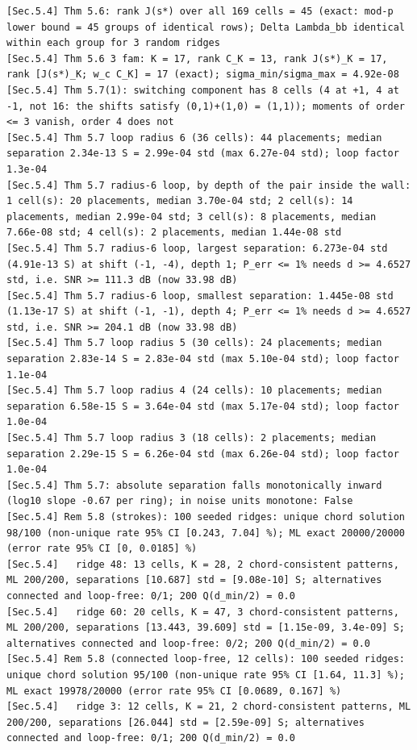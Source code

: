 \documentclass[11pt,a4paper]{article}
\theoremstyle{definition}
\theoremstyle{remark}
\begin{document}
\begin{lstlisting}[style=consolestyle]
[Sec.5.4] Thm 5.6: rank J(s*) over all 169 cells = 45 (exact: mod-p lower bound = 45 groups of identical rows); Delta Lambda_bb identical within each group for 3 random ridges
[Sec.5.4] Thm 5.6 3 fam: K = 17, rank C_K = 13, rank J(s*)_K = 17, rank [J(s*)_K; w_c C_K] = 17 (exact); sigma_min/sigma_max = 4.92e-08
[Sec.5.4] Thm 5.7(1): switching component has 8 cells (4 at +1, 4 at -1, not 16: the shifts satisfy (0,1)+(1,0) = (1,1)); moments of order <= 3 vanish, order 4 does not
[Sec.5.4] Thm 5.7 loop radius 6 (36 cells): 44 placements; median separation 2.34e-13 S = 2.99e-04 std (max 6.27e-04 std); loop factor 1.3e-04
[Sec.5.4] Thm 5.7 radius-6 loop, by depth of the pair inside the wall: 1 cell(s): 20 placements, median 3.70e-04 std; 2 cell(s): 14 placements, median 2.99e-04 std; 3 cell(s): 8 placements, median 7.66e-08 std; 4 cell(s): 2 placements, median 1.44e-08 std
[Sec.5.4] Thm 5.7 radius-6 loop, largest separation: 6.273e-04 std (4.91e-13 S) at shift (-1, -4), depth 1; P_err <= 1% needs d >= 4.6527 std, i.e. SNR >= 111.3 dB (now 33.98 dB)
[Sec.5.4] Thm 5.7 radius-6 loop, smallest separation: 1.445e-08 std (1.13e-17 S) at shift (-1, -1), depth 4; P_err <= 1% needs d >= 4.6527 std, i.e. SNR >= 204.1 dB (now 33.98 dB)
[Sec.5.4] Thm 5.7 loop radius 5 (30 cells): 24 placements; median separation 2.83e-14 S = 2.83e-04 std (max 5.10e-04 std); loop factor 1.1e-04
[Sec.5.4] Thm 5.7 loop radius 4 (24 cells): 10 placements; median separation 6.58e-15 S = 3.64e-04 std (max 5.17e-04 std); loop factor 1.0e-04
[Sec.5.4] Thm 5.7 loop radius 3 (18 cells): 2 placements; median separation 2.29e-15 S = 6.26e-04 std (max 6.26e-04 std); loop factor 1.0e-04
[Sec.5.4] Thm 5.7: absolute separation falls monotonically inward (log10 slope -0.67 per ring); in noise units monotone: False
[Sec.5.4] Rem 5.8 (strokes): 100 seeded ridges: unique chord solution 98/100 (non-unique rate 95% CI [0.243, 7.04] %); ML exact 20000/20000 (error rate 95% CI [0, 0.0185] %)
[Sec.5.4]   ridge 48: 13 cells, K = 28, 2 chord-consistent patterns, ML 200/200, separations [10.687] std = [9.08e-10] S; alternatives connected and loop-free: 0/1; 200 Q(d_min/2) = 0.0
[Sec.5.4]   ridge 60: 20 cells, K = 47, 3 chord-consistent patterns, ML 200/200, separations [13.443, 39.609] std = [1.15e-09, 3.4e-09] S; alternatives connected and loop-free: 0/2; 200 Q(d_min/2) = 0.0
[Sec.5.4] Rem 5.8 (connected loop-free, 12 cells): 100 seeded ridges: unique chord solution 95/100 (non-unique rate 95% CI [1.64, 11.3] %); ML exact 19978/20000 (error rate 95% CI [0.0689, 0.167] %)
[Sec.5.4]   ridge 3: 12 cells, K = 21, 2 chord-consistent patterns, ML 200/200, separations [26.044] std = [2.59e-09] S; alternatives connected and loop-free: 0/1; 200 Q(d_min/2) = 0.0

\end{lstlisting}
\end{document}
